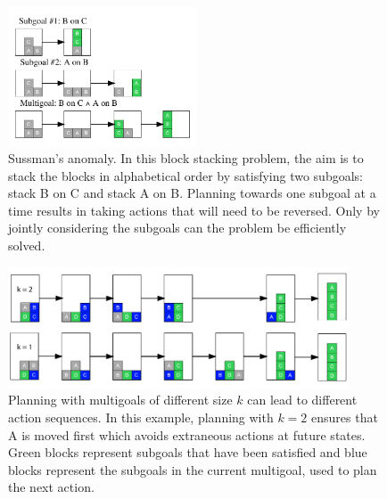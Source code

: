 \documentclass[10pt,letterpaper]{article}
\newcommand{\todo}[1]{\textcolor{red}{\textsc{[TODO: #1]}}}
\begin{document}


\begin{figure}[ht!]
    \centering
    \includegraphics[width=0.5\textwidth]{example-suss}
    \caption{Sussman's anomaly. In this block stacking problem, the aim is to stack the blocks in alphabetical order by satisfying two subgoals: stack B on C and stack A on B. Planning towards one subgoal at a time results in taking actions that will need to be reversed. Only by jointly considering the subgoals can the problem be efficiently solved.}
    \label{fig:suss}
\end{figure}

\begin{figure}[ht]
    \centering
    \includegraphics[width=0.9\textwidth]{example-4-block}
    \caption{
    Planning with multigoals of different size $k$ can lead to different action sequences. In this example, planning with $k=2$ ensures that A is moved first which avoids extraneous actions at future states. Green blocks represent subgoals that have been satisfied and blue blocks represent the subgoals in the current multigoal, used to plan the next action.
    }
    \label{fig:fourblock}
\end{figure}
\end{document}
